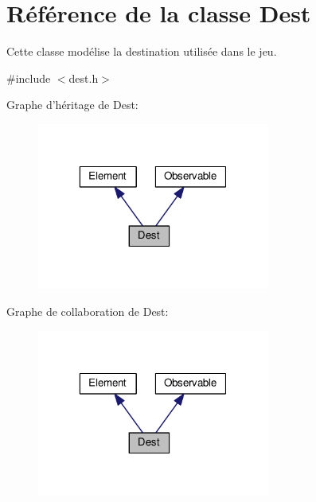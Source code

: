 \hypertarget{classDest}{\section{Référence de la classe Dest}
\label{classDest}
}


Cette classe modélise la destination utilisée dans le jeu.  




{\ttfamily \#include $<$dest.\+h$>$}



Graphe d'héritage de Dest\+:
\nopagebreak
\begin{figure}[H]
\begin{center}
\leavevmode
\includegraphics[width=217pt]{d9/d5c/classDest__inherit__graph}
\end{center}
\end{figure}


Graphe de collaboration de Dest\+:
\nopagebreak
\begin{figure}[H]
\begin{center}
\leavevmode
\includegraphics[width=217pt]{d4/d77/classDest__coll__graph}
\end{center}
\end{figure}
